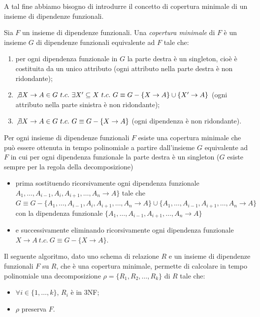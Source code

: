 A tal fine abbiamo bisogno di introdurre il concetto di copertura minimale di un insieme di dipendenze funzionali.
\begin{defn}
Sia $F$ un insieme di dipendenze funzionali. Una \emph{copertura minimale} di $F$ è un insieme $G$ di dipendenze 
funzionali equivalente ad $F$ tale che:
\begin{enumerate}
 \item per ogni dipendenza funzionale in $G$ la parte destra è un singleton, cioè è costituita da un unico
attributo (ogni attributo nella parte destra è non ridondante);
 \item $\not\exists X \rightarrow A \in G\ t.c.\ \exists X' \subseteq X\ t.c.\ G \equiv G - \{X \rightarrow A\} 
 \cup \{X' \rightarrow A\}$ (ogni attributo nella parte sinistra è non ridondante);
 \item $\not\exists X \rightarrow A \in G\ t.c.\ G \equiv G - \{X \rightarrow A\}$ (ogni dipendenza è non ridondante). 
\end{enumerate}
\end{defn}
Per ogni insieme di dipendenze funzionali $F$ esiste una copertura minimale che può essere ottenuta in tempo polinomiale
a partire dall'insieme $G$ equivalente ad $F$ in cui per ogni dipendenza funzionale la parte destra è un singleton 
($G$ esiste sempre per la regola della decomposizione)
\begin{itemize}
 \item prima sostituendo ricorsivamente ogni dipendenza funzionale $A_1, \ldots, A_{i-1}, A_i, A_{i+1}, \ldots, A_n 
 \rightarrow A\}$ tale che $G \equiv G - \{A_1, \ldots, A_{i-1}, A_i, A_{i+1}, \ldots, A_n \rightarrow A\} \cup 
 \{A_1, \ldots, A_{i-1}, A_{i+1}, \ldots, A_n \rightarrow A\}$ con la dipendenza funzionale $\{A_1, \ldots, A_{i-1}, A_{i+1},
 \ldots, A_n \rightarrow A\}$
 \item e successivamente eliminando ricorsivamente ogni dipendenza funzionale $X \rightarrow A\ t.c.\ G \equiv G- 
 \{X \rightarrow A\}$.
\end{itemize}

Il seguente algoritmo, dato uno schema di relazione $R$ e un insieme di dipendenze funzionali $F$ su $R$, che è una 
copertura minimale, permette di calcolare in tempo polinomiale una decomposizione $\rho = \{R_1, R_2, \ldots, R_k\}$ 
di $R$ tale che:
\begin{itemize}
 \item $\forall i \in \{1, \ldots, k\}$, $R_i$ è in 3NF;
 \item $\rho$ preserva $F$.
\end{itemize}


